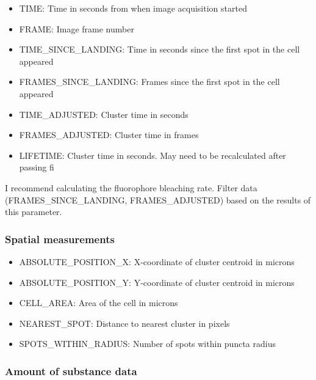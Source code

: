 \begin{itemize}
    \item TIME: Time in seconds from when image acquisition started
    \item FRAME: Image frame number
    \item TIME\_SINCE\_LANDING: Time in seconds since the first spot in the cell appeared
    \item FRAMES\_SINCE\_LANDING: Frames since the first spot in the cell appeared
    \item TIME\_ADJUSTED: Cluster time in seconds
    \item FRAMES\_ADJUSTED: Cluster time in frames
    \item LIFETIME: Cluster time in seconds. May need to be recalculated after passing fi
\end{itemize}

I recommend calculating the fluorophore bleaching rate. Filter data (FRAMES\_SINCE\_LANDING, FRAMES\_ADJUSTED) based on the results of this parameter.

\subsubsection*{Spatial measurements}

\begin{itemize}
    \item ABSOLUTE\_POSITION\_X: X-coordinate of cluster centroid in microns
    \item ABSOLUTE\_POSITION\_Y: Y-coordinate of cluster centroid in microns
    \item CELL\_AREA: Area of the cell in microns
    \item NEAREST\_SPOT: Distance to nearest cluster in pixels
    \item SPOTS\_WITHIN\_RADIUS: Number of spots within puncta radius
\end{itemize}

\subsubsection*{Amount of substance data}

